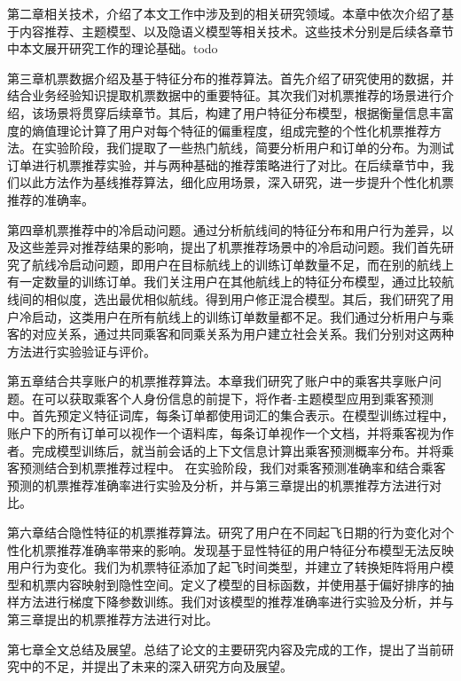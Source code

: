 第二章相关技术，介绍了本文工作中涉及到的相关研究领域。本章中依次介绍了基于内容推荐、主题模型、以及隐语义模型等相关技术。这些技术分别是后续各章节中本文展开研究工作的理论基础。todo

第三章机票数据介绍及基于特征分布的推荐算法。首先介绍了研究使用的数据，并结合业务经验知识提取机票数据中的重要特征。其次我们对机票推荐的场景进行介绍，该场景将贯穿后续章节。其后，构建了用户特征分布模型，根据衡量信息丰富度的熵值理论计算了用户对每个特征的偏重程度，组成完整的个性化机票推荐方法。在实验阶段，我们提取了一些热门航线，简要分析用户和订单的分布。为测试订单进行机票推荐实验，并与两种基础的推荐策略进行了对比。在后续章节中，我们以此方法作为基线推荐算法，细化应用场景，深入研究，进一步提升个性化机票推荐的准确率。

第四章机票推荐中的冷启动问题。通过分析航线间的特征分布和用户行为差异，以及这些差异对推荐结果的影响，提出了机票推荐场景中的冷启动问题。我们首先研究了航线冷启动问题，即用户在目标航线上的训练订单数量不足，而在别的航线上有一定数量的训练订单。我们关注用户在其他航线上的特征分布模型，通过比较航线间的相似度，选出最优相似航线。得到用户修正混合模型。其后，我们研究了用户冷启动，这类用户在所有航线上的训练订单数量都不足。我们通过分析用户与乘客的对应关系，通过共同乘客和同乘关系为用户建立社会关系。我们分别对这两种方法进行实验验证与评价。

第五章结合共享账户的机票推荐算法。本章我们研究了账户中的乘客共享账户问题。在可以获取乘客个人身份信息的前提下，将作者-主题模型应用到乘客预测中。首先预定义特征词库，每条订单都使用词汇的集合表示。在模型训练过程中，账户下的所有订单可以视作一个语料库，每条订单视作一个文档，并将乘客视为作者。完成模型训练后，就当前会话的上下文信息计算出乘客预测概率分布。并将乘客预测结合到机票推荐过程中。
在实验阶段，我们对乘客预测准确率和结合乘客预测的机票推荐准确率进行实验及分析，并与第三章提出的机票推荐方法进行对比。

第六章结合隐性特征的机票推荐算法。研究了用户在不同起飞日期的行为变化对个性化机票推荐准确率带来的影响。发现基于显性特征的用户特征分布模型无法反映用户行为变化。我们为机票特征添加了起飞时间类型，并建立了转换矩阵将用户模型和机票内容映射到隐性空间。定义了模型的目标函数，并使用基于偏好排序的抽样方法进行梯度下降参数训练。我们对该模型的推荐准确率进行实验及分析，并与第三章提出的机票推荐方法进行对比。

第七章全文总结及展望。总结了论文的主要研究内容及完成的工作，提出了当前研究中的不足，并提出了未来的深入研究方向及展望。